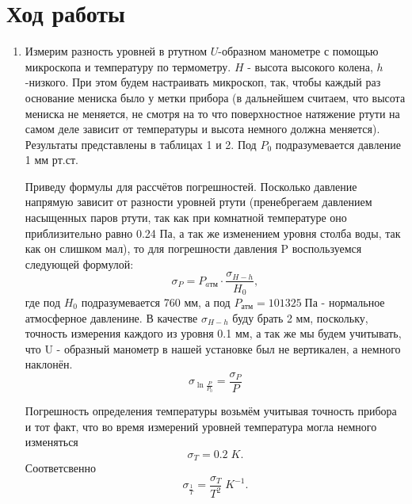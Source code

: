\documentclass[a4paper,12pt]{article}
\begin{document}
\section{Ход работы}

\begin{enumerate}
\item Измерим разность уровней в ртутном $U$-образном манометре с помощью микроскопа и температуру по термометру. $H$ - высота высокого колена, $h$ -низкого. При этом будем настраивать микроскоп, так, чтобы каждый раз основание мениска было у метки прибора (в дальнейшем считаем, что высота мениска не меняется, не смотря на то что поверхностное натяжение ртути на самом деле зависит от температуры и высота немного должна меняется). Результаты представлены в таблицах 1 и 2. Под $P_0$ подразумевается давление 1 мм рт.ст.

Приведу формулы для рассчётов погрешностей.
Посколько давление напрямую зависит от разности уровней ртути (пренебрегаем давлением насыщенных паров ртути, так как при комнатной температуре оно приблизительно равно 0.24 Па, а так же изменением уровня столба воды, так как он слишком мал), то
для погрешности давления P воспользуемся следующей формулой: $$ \sigma_P = P_{aтм} \cdot \frac{\sigma_{H-h}}{H_0},$$ где под $H_0$ подразумевается 760 мм, а под $P_{атм} = 101325 \; Па$ - нормальное атмосферное давленине. В качестве $\sigma_{H-h}$ буду брать 2 мм, поскольку, точность измерения каждого из уровня 0.1 мм, а так же мы будем учитывать, что U - образный манометр в нашей установке был не вертикален, а немного наклонён.
$$\sigma_{\ln{\frac{P}{P_0}}} = \frac{\sigma_P}{P} $$

Погрешность определения температуры возьмём учитывая точность прибора и тот факт, что во время измерений уровней температура могла немного изменяться $$\sigma_{T} = 0.2 \; K.$$ Соответсвенно $$\sigma_{\frac{1}{T}} = \frac{\sigma_T}{T^2} \; K^{-1}.$$


\end{enumerate}
\end{document}
